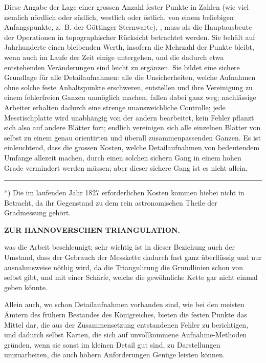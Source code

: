 Diese Angabe der Lage einer grossen Anzahl fester Punkte in Zahlen
(wie viel nemlich nördlich oder südlich, westlich oder östlich, von einem beliebigen
Anfangspunkte, z.~B. der Göttinger Sternwarte), , muss als die Hauptausbeute der Operationen in topographischer
Rücksicht betrachtet werden. Sie behält auf Jahrhunderte einen bleibenden
Werth, insofern die Mehrzahl der Punkte bleibt, wenn auch im Laufe der
Zeit einige untergehen, und die dadurch etwa entstehenden Veränderungen
sind leicht zu ergänzen. Sie bildet eine sichere Grundlage für alle Detailaufnahmen:
alle die Unsicherheiten, welche Aufnahmen ohne solche feste Anhaltspunkte
erschweren, entstellen und ihre Vereinigung zu einem fehlerfreien
Ganzen unmöglich machen, fallen dabei ganz weg; nachlässige Arbeiter erhalten
dadurch eine strenge unausweichliche Controlle; jede Messtischplatte
wird unabhängig von der andern bearbeitet, kein Fehler pflanzt sich also auf
andere Blätter fort; endlich vereinigen sich alle einzelnen Blätter von selbst
zu einem genau orientirten und überall zusammenpassenden Ganzen. Es ist
einleuchtend, dass die grossen Kosten, welche Detailaufnahmen von bedeutendem
Umfange allezeit machen, durch einen solchen sichern Gang in einem hohen
Grade vermindert werden müssen; aber dieser sichere Gang ist es nicht allein,
\par\vfill\noindent\rule{0.25\linewidth}{0.4pt}\par\smallskip
{\footnotesize\noindent\hspace*{\parindent}*) Die im laufenden Jahr 1827 erforderlichen Kosten kommen hiebei nicht in Betracht, da ihr Gegenstand zu dem rein astronomischen Theile der Gradmessung gehört.\par}
\clearpage
\noindent\null\hfill{\small\textbf{ZUR HANNOVERSCHEN TRIANGULATION.}}\hfill{}\par\medskip
\noindent was die Arbeit beschleunigt; sehr wichtig ist in dieser Beziehung auch der
Umstand, dass der Gebrauch der Messkette dadurch fast ganz überflüssig und
nur ausnahmsweise nöthig wird, da die Triangulirung die Grundlinien schon
von selbst gibt, und mit einer Schärfe, welche die gewöhnliche Kette gar
nicht einmal geben könnte.

Allein auch, wo schon Detailaufnahmen vorhanden sind, wie bei den
meisten Ämtern des frühern Bestandes des Königreiches, bieten die festen
Punkte das Mittel dar, die aus der Zusammensetzung entstandenen Fehler zu
berichtigen, und dadurch selbst Karten, die sich auf unvollkommene Aufnahme-Methoden
gründen, wenn sie sonst im kleinen Detail gut sind, zu Darstellungen
umzuarbeiten, die auch höhern Anforderungen Genüge leisten können.

